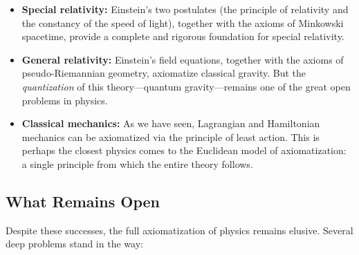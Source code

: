 \begin{itemize}
    \item \textbf{Special relativity:} Einstein's two postulates (the principle of relativity and the constancy of the speed of light), together with the axioms of Minkowski spacetime, provide a complete and rigorous foundation for special relativity.

    \item \textbf{General relativity:} Einstein's field equations, together with the axioms of pseudo-Riemannian geometry, axiomatize classical gravity. But the \emph{quantization} of this theory---quantum gravity---remains one of the great open problems in physics.

    \item \textbf{Classical mechanics:} As we have seen, Lagrangian and Hamiltonian mechanics can be axiomatized via the principle of least action. This is perhaps the closest physics comes to the Euclidean model of axiomatization: a single principle from which the entire theory follows.
\end{itemize}

\subsection{What Remains Open}

Despite these successes, the full axiomatization of physics remains elusive. Several deep problems stand in the way:

